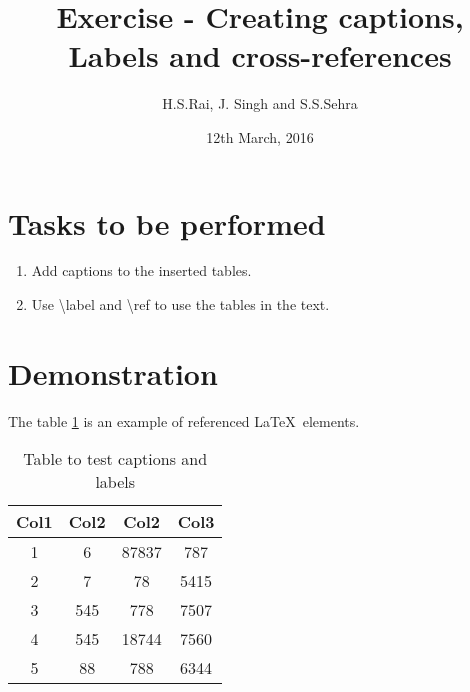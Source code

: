 \documentclass{article}
\title{Exercise - Creating captions, Labels and cross-references}
\author{H.S.Rai, J. Singh and S.S.Sehra}
\date{12th March, 2016}
\begin{document}
	\maketitle	
	\section*{Tasks to be performed}
	\begin{enumerate}	
		\item Add captions to the inserted tables.
		\item Use \textbackslash label and \textbackslash ref to use the tables in the text.
	\end{enumerate}
	\section*{Demonstration}
		
	The table \ref{table:1} is an example of   referenced \LaTeX\ elements.
	
	\begin{table}[h!]
		\centering
		\begin{tabular}{||c c c c||} 
			\hline
			Col1 & Col2 & Col2 & Col3 \\ 
			\hline\hline
			1 & 6 & 87837 & 787 \\ 
			2 & 7 & 78 & 5415 \\
			3 & 545 & 778 & 7507 \\
			4 & 545 & 18744 & 7560 \\
			5 & 88 & 788 & 6344 \\  
			\hline
		\end{tabular}
		\caption{Table to test captions and labels}
		\label{table:1}
	\end{table}
	
	
	
	
\end{document}

